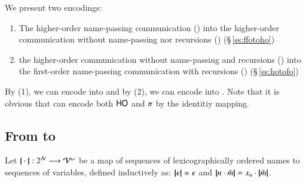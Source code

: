 We present two encodings:
\begin{enumerate}
\item The higher-order name-passing communication (\HOp) into 
the higher-order communication without name-passing nor 
recursions (\HO) (\S\,\ref{ss:ffotoho})
\item the higher-order communication without 
name-passing and recursions (\HO)
into the first-order name-passing communication
with recursions (\sessp) (\S\,\ref{ss:hotofo})
\end{enumerate}
By (1), we can encode \sessp into \HO and by (2), 
we can encode \HOp into \sessp.  
Note that it is obvious that \HOp can encode both 
$\mathsf{HO}$ and $\pi$ by the identitiy mapping. 

\subsection{From \sessp to \HO}
\label{subsec:sesspHO}

\begin{definition}\rm 
	Let $|\!|\cdot|\!|: 2^{\mathcal{N}} \longrightarrow \mathcal{V}^\omega$
	be a map of sequences of 
lexicographically ordered names to sequences of variables, defined
	inductively as: 
	$|\!|\epsilon|\!| = \epsilon$ and $|\!|n \cdot \tilde{m}|\!| = x_n \cdot |\!|\tilde{m}|\!|$. 
\end{definition}

